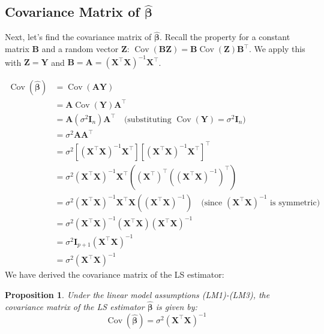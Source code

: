 \documentclass[11pt, letterpaper]{article}
\theoremstyle{definition}
\theoremstyle{plain} %
\newtheorem{proposition}[definition]{Proposition} %
\theoremstyle{remark}
\newcommand{\Cov}{\operatorname{Cov}}  %
\newcommand{\vb}[1]{\bm{#1}}          %
\newcommand{\mb}[1]{\bm{#1}}          %
\newcommand{\Yvec}{\vb{Y}}            %
\newcommand{\Xmat}{\mb{X}}            %
\newcommand{\Amat}{\mb{A}}            %
\newcommand{\Imat}{\mb{I}}            %
\newcommand{\betahatvec}{\vb{\hat{\beta}}}%
\newcommand{\Zvec}{\vb{Z}}            %
\begin{document}
\subsection{Covariance Matrix of \texorpdfstring{$\betahatvec$}{beta-hat}}

Next, let's find the covariance matrix of $\betahatvec$. Recall the property for a constant matrix $\mb{B}$ and a random vector $\Zvec$: $\Cov(\mb{B} \Zvec) = \mb{B} \Cov(\Zvec) \mb{B}^\top$. We apply this with $\Zvec = \Yvec$ and $\mb{B} = \Amat = (\Xmat^\top \Xmat)^{-1} \Xmat^\top$.

\begin{align*}
\Cov(\betahatvec) &= \Cov(\Amat \Yvec) \\
&= \Amat \Cov(\Yvec) \Amat^\top \\
&= \Amat (\sigma^2 \Imat_n) \Amat^\top \quad \text{(substituting } \Cov(\Yvec) = \sigma^2 \Imat_n \text{)} \\
&= \sigma^2 \Amat \Amat^\top \\
&= \sigma^2 \left[ (\Xmat^\top \Xmat)^{-1} \Xmat^\top \right] \left[ (\Xmat^\top \Xmat)^{-1} \Xmat^\top \right]^\top \\
&= \sigma^2 (\Xmat^\top \Xmat)^{-1} \Xmat^\top \left( (\Xmat^\top)^\top ((\Xmat^\top \Xmat)^{-1})^\top \right) \\
&= \sigma^2 (\Xmat^\top \Xmat)^{-1} \Xmat^\top \Xmat ((\Xmat^\top \Xmat)^{-1}) \quad \text{(since } (\Xmat^\top \Xmat)^{-1} \text{ is symmetric)} \\
&= \sigma^2 (\Xmat^\top \Xmat)^{-1} (\Xmat^\top \Xmat) (\Xmat^\top \Xmat)^{-1} \\
&= \sigma^2 \Imat_{p+1} (\Xmat^\top \Xmat)^{-1} \\
&= \sigma^2 (\Xmat^\top \Xmat)^{-1}
\end{align*}
We have derived the covariance matrix of the LS estimator:
\begin{proposition}
Under the linear model assumptions (LM1)-(LM3), the covariance matrix of the LS estimator $\betahatvec$ is given by:
\[
\boxed{\Cov(\betahatvec) = \sigma^2 (\Xmat^\top \Xmat)^{-1}}
\]
\end{proposition}
\end{document}
